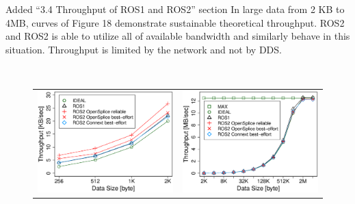 \documentclass{article}
\begin{document}
\begin{enumerate}
\begin{itembox}[|]{Added ``3.4 Throughput of ROS1 and ROS2'' section}
    In large data from 2 KB to 4MB, curves of Figure 18 demonstrate sustainable theoretical throughput.
    ROS2 and ROS2 is able to utilize all of available bandwidth and similarly behave in this situation.
    Throughput is limited by the network and not by DDS.
  \end{itembox}\\
  \setcounter{figure}{16}
  \begin{figure}[h]
    \begin{tabular}{cc}
      \begin{minipage}[t]{0.5\textwidth}
        \includegraphics[width=1.0\linewidth]{../../figure/throughput_remote_small-data.eps}
        \caption{}
        \label{fig:throughput_small}
      \end{minipage}
      &
      \begin{minipage}[t]{0.5\textwidth}
        \includegraphics[width=1.0\linewidth]{../../figure/throughput_remote_large-data.eps}
        \caption{}
        \label{fig:throughput_large}
      \end{minipage}
    \end{tabular}
  \end{figure}  

\end{enumerate}
\end{document}
